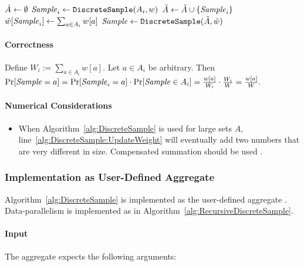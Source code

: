 \begin{algorithm}[RecursiveDiscreteSample$(A_1, A_2, w)$] \label{alg:RecursiveDiscreteSample}
\begin{algorithmic}[1]
	\State $\tilde A \leftarrow \emptyset$
		\State $\mathit{Sample}_i \leftarrow \texttt{DiscreteSample}(A_i, w)$
		\State $\tilde A \leftarrow \tilde A \cup \{ \mathit{Sample}_i \}$
		\State $\tilde w[\mathit{Sample}_i] \leftarrow \sum_{a \in A_i} w[a]$
	\EndFor
	\State $\mathit{Sample} \leftarrow \texttt{DiscreteSample}(\tilde A, \tilde w)$
\end{algorithmic}
\end{algorithm}

\paragraph{Correctness}

Define $W_i := \sum_{a \in A_i} w[a]$. Let $a \in A_i$ be arbitrary. Then $\Pr[\mathit{Sample} = a] = \Pr[\mathit{Sample}_i = a] \cdot \Pr[\mathit{Sample} \in A_i] = \frac{w[a]}{W_i} \cdot \frac{W_i}{W} = \frac{w[a]}{W}.$

\paragraph{Numerical Considerations}

\begin{itemize}
	\item When Algorithm~\ref{alg:DiscreteSample} is used for large sets $A$, line~\ref{alg:DiscreteSample:UpdateWeight} will eventually add two numbers that are very different in size. Compensated summation should be used \cite{ORO05a}.
\end{itemize}

\subsubsection{Implementation as User-Defined Aggregate}

Algorithm~\ref{alg:DiscreteSample} is implemented as the user-defined aggregate . Data-parallelism is implemented as in Algorithm~\ref{alg:RecursiveDiscreteSample}.

\paragraph{Input} The aggregate expects the following arguments:

